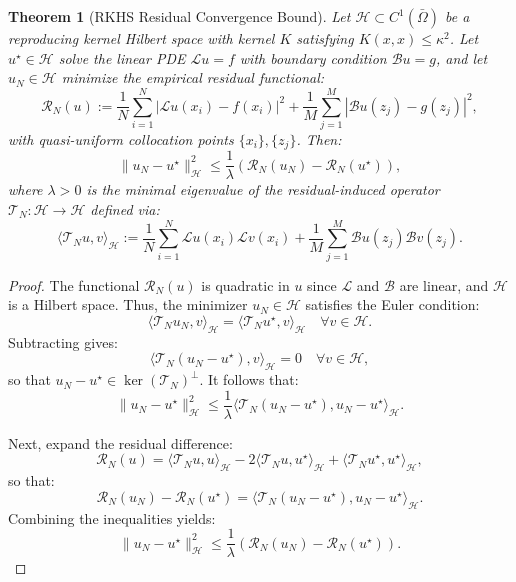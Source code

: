 \documentclass[10pt,a4paper]{amsart}
\newtheorem{thm}{Theorem}
\begin{document}
\begin{thm}[RKHS Residual Convergence Bound]
\label{thm:rkhs_convergence}
Let $\mathcal{H} \subset C^1(\bar{\Omega})$ be a reproducing kernel Hilbert space with kernel $K$ satisfying $K(x,x) \leq \kappa^2$. Let $u^\star \in \mathcal{H}$ solve the linear PDE $\mathcal{L} u = f$ with boundary condition $\mathcal{B} u = g$, and let $u_N \in \mathcal{H}$ minimize the empirical residual functional:
\[
\mathcal{R}_N(u) := \frac{1}{N} \sum_{i=1}^N |\mathcal{L}u(x_i) - f(x_i)|^2 + \frac{1}{M} \sum_{j=1}^M |\mathcal{B}u(z_j) - g(z_j)|^2,
\]
with quasi-uniform collocation points $\{x_i\}, \{z_j\}$. Then:
\[
\| u_N - u^\star \|_{\mathcal{H}}^2 \leq \frac{1}{\lambda} \left( \mathcal{R}_N(u_N) - \mathcal{R}_N(u^\star) \right),
\]
where $\lambda > 0$ is the minimal eigenvalue of the residual-induced operator $\mathcal{T}_N: \mathcal{H} \to \mathcal{H}$ defined via:
\[
\langle \mathcal{T}_N u, v \rangle_{\mathcal{H}} := \frac{1}{N} \sum_{i=1}^N \mathcal{L}u(x_i)\mathcal{L}v(x_i) + \frac{1}{M} \sum_{j=1}^M \mathcal{B}u(z_j)\mathcal{B}v(z_j).
\]
\end{thm}

\begin{proof}
The functional $\mathcal{R}_N(u)$ is quadratic in $u$ since $\mathcal{L}$ and $\mathcal{B}$ are linear, and $\mathcal{H}$ is a Hilbert space. Thus, the minimizer $u_N \in \mathcal{H}$ satisfies the Euler condition:
\[
\langle \mathcal{T}_N u_N, v \rangle_{\mathcal{H}} = \langle \mathcal{T}_N u^\star, v \rangle_{\mathcal{H}} \quad \forall v \in \mathcal{H}.
\]
Subtracting gives:
\[
\langle \mathcal{T}_N(u_N - u^\star), v \rangle_{\mathcal{H}} = 0 \quad \forall v \in \mathcal{H},
\]
so that $u_N - u^\star \in \ker(\mathcal{T}_N)^\perp$. It follows that:
\[
\| u_N - u^\star \|_{\mathcal{H}}^2 \leq \frac{1}{\lambda} \langle \mathcal{T}_N(u_N - u^\star), u_N - u^\star \rangle_{\mathcal{H}}.
\]

Next, expand the residual difference:
\[
\mathcal{R}_N(u) = \langle \mathcal{T}_N u, u \rangle_{\mathcal{H}} - 2\langle \mathcal{T}_N u, u^\star \rangle_{\mathcal{H}} + \langle \mathcal{T}_N u^\star, u^\star \rangle_{\mathcal{H}},
\]
so that:
\[
\mathcal{R}_N(u_N) - \mathcal{R}_N(u^\star) = \langle \mathcal{T}_N(u_N - u^\star), u_N - u^\star \rangle_{\mathcal{H}}.
\]
Combining the inequalities yields:
\[
\| u_N - u^\star \|_{\mathcal{H}}^2 \leq \frac{1}{\lambda} \left( \mathcal{R}_N(u_N) - \mathcal{R}_N(u^\star) \right).
\]
\end{proof}
\end{document}
